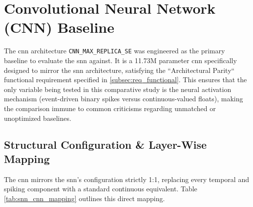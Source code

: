 \section{Convolutional Neural Network (CNN) Baseline}
\label{sec:cnn_baseline}

The \gls{cnn} architecture \texttt{CNN\_MAX\_REPLICA\_SE} was engineered as the primary baseline to evaluate the \gls{snn} against.
It is a 11.73M parameter \gls{cnn} specifically designed to mirror the \gls{snn} architecture, satisfying the ``Architectural Parity`` functional requirement specified in \ref{subsec:req_functional}. 
This ensures that the only variable being tested in this comparative study is the neural activation mechanism (event-driven binary spikes versus continuous-valued floats), making the comparison immune to common criticisms regarding unmatched or unoptimized baselines.

\subsection{Structural Configuration \& Layer-Wise Mapping}
The \gls{cnn} mirrors the \gls{snn}'s configuration strictly 1:1, replacing every temporal and spiking component with a standard continuous equivalent. Table \ref{tab:snn_cnn_mapping} outlines this direct mapping.

